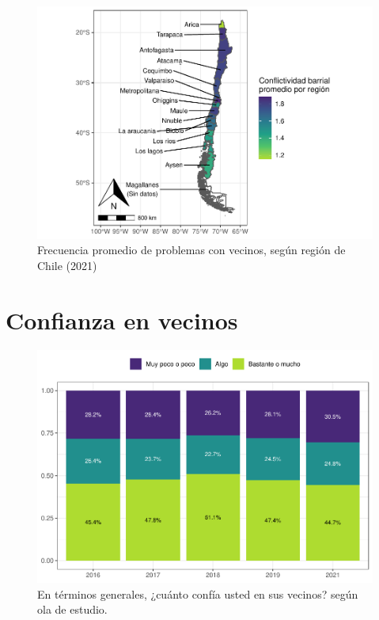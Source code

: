 \documentclass[
  12pt,
  openany]{book}
\begin{document}
\begin{figure}

{\centering \includegraphics{reporte-elsoc_files/figure-latex/confli-region2-1} 

}

\caption{Frecuencia promedio de problemas con vecinos, según región de Chile (2021)}\label{fig:confli-region2}
\end{figure}

\hypertarget{confianza-en-vecinos}{%
\section{Confianza en vecinos}\label{confianza-en-vecinos}}

\begin{figure}

{\centering \includegraphics{reporte-elsoc_files/figure-latex/vecinos-ola-1} 

}

\caption{En términos generales, ¿cuánto confía usted en sus vecinos? según ola de estudio.}\label{fig:vecinos-ola}
\end{figure}
\end{document}
